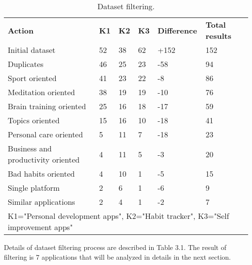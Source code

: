 \begin{table}[t!]
    \centering
    \begin{adjustbox}{width=\textwidth}
        \begin{ctucolortab}
            \begin{tabular}{llllll}
                \bfseries Action & \bfseries K1 & \bfseries K2 & \bfseries K3 & \bfseries Difference & \bfseries Total results \\\Midrule
                Initial dataset & 52 & 38 & 62 & +152 & 152\\
                Duplicates & 46 & 25 & 23 & -58 & 94\\
                Sport oriented & 41 & 23 & 22 & -8 & 86\\
                Meditation oriented & 38 & 19 & 19 & -10 & 76\\
                Brain training oriented & 25 & 16 & 18 & -17 & 59\\
                Topics oriented & 15 & 16 & 10 & -18 & 41\\
                Personal care oriented & 5 & 11 & 7 & -18 & 23\\
                Business and productivity oriented & 4 & 11 & 5 & -3 & 20\\
                Bad habits oriented & 4 & 10 & 1 & -5 & 15\\
                Single platform & 2 & 6 & 1 & -6 & 9\\
                Similar applications & 2 & 4 & 1 & -2 & 7\\
                \bottomrule
                \multicolumn{6}{1}{K1="Personal development apps", K2="Habit tracker", K3="Self improvement apps"}
            \end{tabular}
        \end{ctucolortab}
    \end{adjustbox}
    \caption{Dataset filtering.}
    \label{tab:dataset-filtering}
\end{table}

Details of dataset filtering process are described in Table 3.1.
The result of filtering is 7 applications that will be analyzed in details in the next section.
